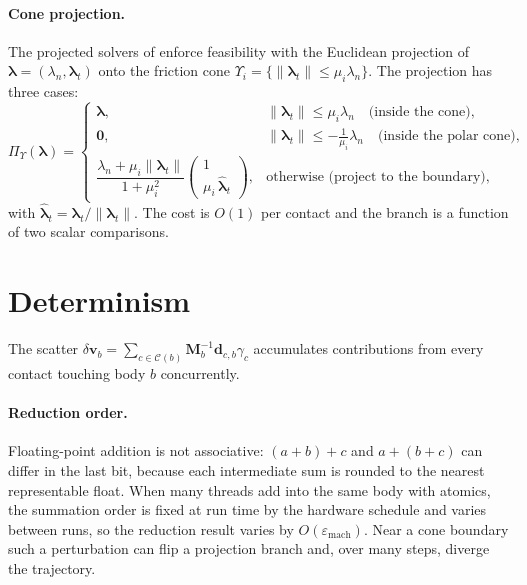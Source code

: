 \documentclass{article}
\newcommand{\M}{\mathbf{M}}
\newcommand{\vv}{\mathbf{v}}
\newcommand{\blam}{\boldsymbol{\lambda}}
\newcommand{\cone}{\Upsilon}
\newcommand{\proj}{\Pi_{\cone}}
\theoremstyle{plain}
\theoremstyle{definition}
\begin{document}
\paragraph{Cone projection.}
\label{app:projection}
The projected solvers of  enforce feasibility with the
Euclidean projection of $\blam=(\lambda_n,\boldsymbol\lambda_t)$ onto the
friction cone $\cone_i=\{\|\boldsymbol\lambda_t\|\le\mu_i\lambda_n\}$. The
projection has three cases:
\begin{equation}
\proj(\blam)=
\begin{cases}
\blam, & \|\boldsymbol\lambda_t\|\le\mu_i\lambda_n \quad\text{(inside the cone)},\\[4pt]
\mathbf 0, & \|\boldsymbol\lambda_t\|\le-\tfrac{1}{\mu_i}\lambda_n \quad\text{(inside the polar cone)},\\[4pt]
\dfrac{\lambda_n+\mu_i\|\boldsymbol\lambda_t\|}{1+\mu_i^2}
\begin{pmatrix}1\\[2pt]\mu_i\,\hat{\boldsymbol\lambda}_t\end{pmatrix},
& \text{otherwise (project to the boundary)},
\end{cases}
\label{eq:proj_app}
\end{equation}
with $\hat{\boldsymbol\lambda}_t=\boldsymbol\lambda_t/\|\boldsymbol\lambda_t\|$.
The cost is $O(1)$ per contact and the branch is a function of two scalar
comparisons.

\section{Determinism}
\label{app:determinism}
The scatter $\delta\vv_b=\sum_{c\in\mathcal C(b)}\M_b^{-1}\mathbf d_{c,b}\gamma_c$
accumulates contributions from every contact touching body $b$ concurrently.

\paragraph{Reduction order.} Floating-point addition is not associative:
$(a+b)+c$ and $a+(b+c)$ can differ in the last bit, because each intermediate sum
is rounded to the nearest representable float. When many threads add into the same
body with atomics, the summation order is fixed at run time by the hardware
schedule and varies between runs, so the reduction result varies by
$O(\varepsilon_{\mathrm{mach}})$. Near a cone boundary such a perturbation can flip
a projection branch and, over many steps, diverge the trajectory.
\end{document}

